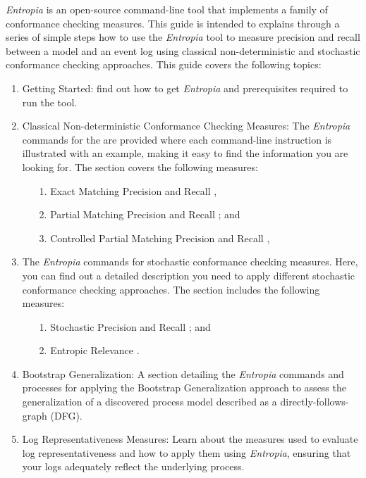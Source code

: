 \textit{Entropia} is an open-source command-line tool that implements a family of conformance checking measures. This guide is intended to explains through a series of simple steps how to use the \textit{Entropia} tool to measure precision and recall between a model and an event log using classical non-deterministic and stochastic conformance checking approaches. This guide covers the following topics:

\begin{enumerate}
\itemsep0em 
\item Getting Started: find out how to get \textit{Entropia} and prerequisites required to run the tool.  
\item Classical Non-deterministic Conformance Checking Measures: The \textit{Entropia} commands for the are provided where each command-line instruction is illustrated with an example, making it easy to find the information you are looking for. The section covers the following measures: 
\begin{enumerate}
\itemsep0em 
\item[1.] Exact Matching Precision and Recall \cite{Polyvyanyy2020TOSEM}, 
\item[2.] Partial Matching Precision and Recall \cite{PolyvyanyyK2019}; and
\item[3.] Controlled Partial Matching Precision and Recall \cite{KalenkovaP2020},
\end{enumerate}
\item The \textit{Entropia} commands for stochastic conformance checking measures. Here, you can find out a detailed description you need to apply different stochastic conformance checking approaches. The section includes the following measures: 
\begin{enumerate}
\item[1.] Stochastic Precision and Recall  \cite{Leemans2020}; and
\item[2.] Entropic Relevance \cite{abs-2007-09310}. 
\end{enumerate}
\item Bootstrap Generalization: A section detailing the \textit{Entropia} commands and processes for applying the Bootstrap Generalization approach to assess the generalization of a discovered process model described as a directly-follows-graph (DFG).
\item Log Representativeness Measures: Learn about the measures used to evaluate log representativeness and how to apply them using \textit{Entropia}, ensuring that your logs adequately reflect the underlying process.
\end{enumerate}

